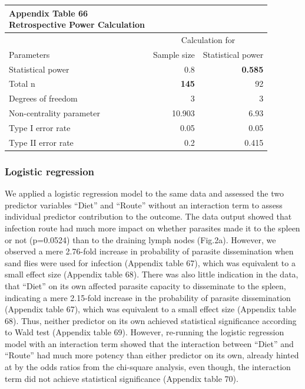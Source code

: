\documentclass[
  12pt,
  letterpaper,
]{article}
\begin{document}
\begingroup
\fontsize{12.0pt}{14.4pt}\selectfont
\begin{longtable}{l|rr}
\caption*{
{\large \textbf{Appendix Table 66}} \\ 
{\small \textbf{Retrospective Power Calculation}}
} \\ 
\toprule
 & \multicolumn{2}{c}{Calculation for} \\ 
\cmidrule(lr){2-3}
Parameters & {Sample size} & {Statistical power} \\ 
\midrule\addlinespace[2.5pt]
Statistical power & 0.8 & {\bfseries 0.585} \\ 
Total n & {\bfseries 145} & 92 \\ 
Degrees of freedom & 3 & 3 \\ 
Non-centrality parameter & 10.903 & 6.93 \\ 
Type I error rate & 0.05 & 0.05 \\ 
Type II error rate & 0.2 & 0.415 \\ 
\bottomrule
\end{longtable}
\endgroup

\subsubsection{Logistic regression}\label{logistic-regression-1}

We applied a logistic regression model to the same data and assessed the two predictor variables ``Diet'' and ``Route'' without an interaction term to assess individual predictor contribution to the outcome. The data output showed that infection route had much more impact on whether parasites made it to the spleen or not (p=0.0524) than to the draining lymph nodes (Fig.2a). However, we observed a mere 2.76-fold increase in probability of parasite dissemination when sand flies were used for infection (Appendix table 67), which was equivalent to a small effect size (Appendix table 68). There was also little indication in the data, that ``Diet'' on its own affected parasite capacity to disseminate to the spleen, indicating a mere 2.15-fold increase in the probability of parasite dissemination (Appendix table 67), which was equivalent to a small effect size (Appendix table 68). Thus, neither predictor on its own achieved statistical significance according to Wald test (Appendix table 69). However, re-running the logistic regression model with an interaction term showed that the interaction between ``Diet'' and ``Route'' had much more potency than either predictor on its own, already hinted at by the odds ratios from the chi-square analysis, even though, the interaction term did not achieve statistical significance (Appendix table 70).
\end{document}
